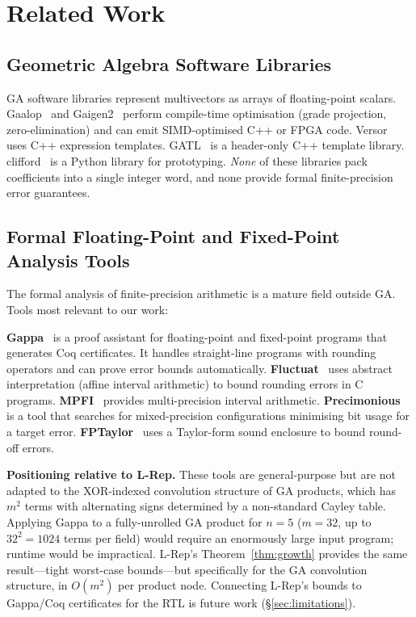 \documentclass[11pt,a4paper]{article}
\theoremstyle{definition}
\theoremstyle{plain}
\theoremstyle{remark}
\begin{document}
\section{Related Work}
\label{sec:related}

\subsection{Geometric Algebra Software Libraries}

GA software libraries represent multivectors as arrays of
floating-point scalars.
Gaalop~\cite{gaalop} and Gaigen2~\cite{fontijne2007} perform
compile-time optimisation (grade projection, zero-elimination) and can
emit SIMD-optimised C++ or FPGA code.
Versor~\cite{versor} uses C++ expression templates.
GATL~\cite{gatl} is a header-only C++ template library.
clifford~\cite{clifford_py} is a Python library for prototyping.
\emph{None} of these libraries pack coefficients into a single integer
word, and none provide formal finite-precision error guarantees.

\subsection{Formal Floating-Point and Fixed-Point Analysis Tools}
\label{sec:related-formal}

The formal analysis of finite-precision arithmetic is a mature field
outside GA.
Tools most relevant to our work:

\textbf{Gappa}~\cite{gappa} is a proof assistant for floating-point and
fixed-point programs that generates Coq certificates.
It handles straight-line programs with rounding operators and can prove
error bounds automatically.
\textbf{Fluctuat}~\cite{fluctuat} uses abstract interpretation
(affine interval arithmetic) to bound rounding errors in C programs.
\textbf{MPFI}~\cite{mpfi} provides multi-precision interval arithmetic.
\textbf{Precimonious}~\cite{precimonious} is a tool that searches for
mixed-precision configurations minimising bit usage for a target error.
\textbf{FPTaylor}~\cite{fptaylor} uses a Taylor-form sound enclosure to
bound round-off errors.

\textbf{Positioning relative to L-Rep.}
These tools are general-purpose but are not adapted to the
XOR-indexed convolution structure of GA products, which has $m^2$
terms with alternating signs determined by a non-standard Cayley table.
Applying Gappa to a fully-unrolled GA product for $n=5$ ($m=32$, up to
$32^2=1024$ terms per field) would require an enormously large input
program; runtime would be impractical.
L-Rep's Theorem~\ref{thm:growth} provides the same result---tight
worst-case bounds---but specifically for the GA convolution structure,
in $O(m^2)$ per product node.
Connecting L-Rep's bounds to Gappa/Coq certificates for the RTL is
future work (\S\ref{sec:limitations}).
\end{document}
